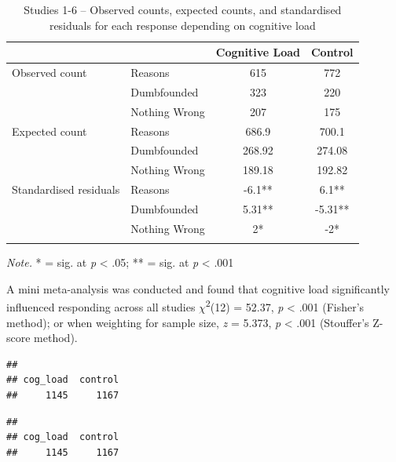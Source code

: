 \documentclass[
  american,
  man,floatsintext]{apa7}
\begin{document}
\begin{table}[tbp]

\begin{center}
\begin{threeparttable}

\caption{\label{tab:Salltab1dumb}Studies 1-6 – Observed counts, expected counts, and standardised residuals for each response depending on cognitive load}

\begin{tabular}{llcc}
\toprule
 & \multicolumn{1}{c}{} & \multicolumn{1}{c}{Cognitive Load} & \multicolumn{1}{c}{Control}\\
\midrule
Observed count & Reasons & 615 & 772\\
 & Dumbfounded & 323 & 220\\
 & Nothing Wrong & 207 & 175\\
Expected count & Reasons & 686.9 & 700.1\\
 & Dumbfounded & 268.92 & 274.08\\
 & Nothing Wrong & 189.18 & 192.82\\
Standardised residuals & Reasons & -6.1** & 6.1**\\
 & Dumbfounded & 5.31** & -5.31**\\
 & Nothing Wrong & 2* & -2*\\
\bottomrule
\addlinespace
\end{tabular}

\begin{tablenotes}[para]
\normalsize{\textit{Note.} * = sig. at \emph{p} < .05; ** = sig. at \emph{p} < .001}
\end{tablenotes}

\end{threeparttable}
\end{center}

\end{table}

A mini meta-analysis was conducted and found that cognitive load significantly influenced responding across all studies \(\chi\)\textsuperscript{2}(12) = 52.37, \emph{p} \textless{} .001 (Fisher's method); or when weighting for sample size, \emph{z} = 5.373, \emph{p} \textless{} .001 (Stouffer's Z-score method).

\begin{verbatim}
## 
## cog_load  control 
##     1145     1167
\end{verbatim}

\begin{verbatim}
## 
## cog_load  control 
##     1145     1167
\end{verbatim}
\end{document}

